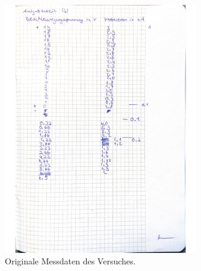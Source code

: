 \begin{figure}[H]
    \centering
    \includegraphics[width=0.75\textwidth]{data/origDaten3.jpg}
    \caption{Originale Messdaten des Versuches.}
    \label{fig:origData3}
\end{figure}